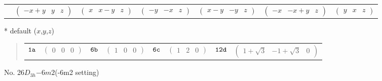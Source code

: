 \documentclass[fleqn,9pt,landscape]{jsarticle}
\begin{document}
\begin{center}
\begin{longtable}{ccccccc}
& $ \begin{pmatrix} - x + y & y & z \end{pmatrix} $ & $ \begin{pmatrix} x & x - y & z \end{pmatrix} $ & $ \begin{pmatrix} - y & - x & z \end{pmatrix} $ & $ \begin{pmatrix} x - y & - y & z \end{pmatrix} $ & $ \begin{pmatrix} - x & - x + y & z \end{pmatrix} $ & $ \begin{pmatrix} y & x & z \end{pmatrix} $ \\
\end{longtable}
\end{center}
* default ($x$,$y$,$z$)
\begin{quote}
\begin{tabular}{cccccccc}
$ {\tt 1a} $ & $ \begin{pmatrix} 0 & 0 & 0 \end{pmatrix} $ & $ {\tt 6b} $ & $ \begin{pmatrix} 1 & 0 & 0 \end{pmatrix} $ & $ {\tt 6c} $ & $ \begin{pmatrix} 1 & 2 & 0 \end{pmatrix} $ & $ {\tt 12d} $ & $ \begin{pmatrix} 1 + \sqrt{3} & -1 + \sqrt{3} & 0 \end{pmatrix} $
\end{tabular}
\end{quote}
\newpage
No. 26\quad$D_{3h}$\quad$-6m2$\quad(-6m2 setting)\quad[ hexagonal ]
\end{document}
